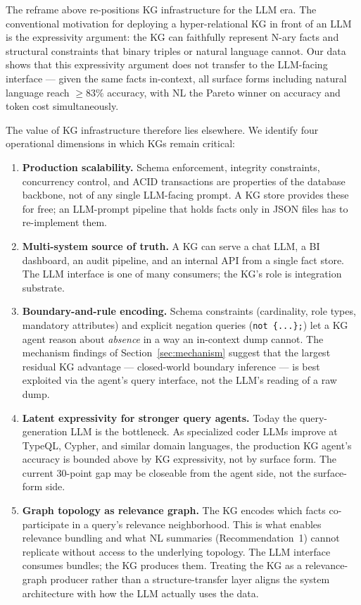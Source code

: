 The reframe above re-positions KG infrastructure for the LLM era.
The conventional motivation for deploying a hyper-relational KG in
front of an LLM is the expressivity argument: the KG can faithfully
represent N-ary facts and structural constraints that binary triples
or natural language cannot. Our data shows that this expressivity
argument does not transfer to the LLM-facing interface — given the
same facts in-context, all surface forms including natural language
reach $\geq 83\%$ accuracy, with NL the Pareto winner on accuracy
and token cost simultaneously.

The value of KG infrastructure therefore lies elsewhere. We identify
four operational dimensions in which KGs remain critical:

\begin{enumerate}
\item \textbf{Production scalability.} Schema enforcement, integrity
      constraints, concurrency control, and ACID transactions are
      properties of the database backbone, not of any single
      LLM-facing prompt. A KG store provides these for free; an
      LLM-prompt pipeline that holds facts only in JSON files has to
      re-implement them.
\item \textbf{Multi-system source of truth.} A KG can serve a chat
      LLM, a BI dashboard, an audit pipeline, and an internal API
      from a single fact store. The LLM interface is one of many
      consumers; the KG's role is integration substrate.
\item \textbf{Boundary-and-rule encoding.} Schema constraints
      (cardinality, role types, mandatory attributes) and explicit
      negation queries (\texttt{not \{...\};}) let a KG agent reason
      about \emph{absence} in a way an in-context dump cannot. The
      mechanism findings of Section~\ref{sec:mechanism} suggest that
      the largest residual KG advantage — closed-world boundary
      inference — is best exploited via the agent's query interface,
      not the LLM's reading of a raw dump.
\item \textbf{Latent expressivity for stronger query agents.} Today
      the query-generation LLM is the bottleneck. As specialized
      coder LLMs improve at TypeQL, Cypher, and similar domain
      languages, the production KG agent's accuracy is bounded above
      by KG expressivity, not by surface form. The current 30-point
      gap may be closeable from the agent side, not the
      surface-form side.
\item \textbf{Graph topology as relevance graph.} The KG encodes
      which facts co-participate in a query's relevance
      neighborhood. This is what enables relevance bundling and
      what NL summaries (Recommendation~1) cannot replicate without
      access to the underlying topology. The LLM interface consumes
      bundles; the KG produces them. Treating the KG as a
      relevance-graph producer rather than a structure-transfer
      layer aligns the system architecture with how the LLM
      actually uses the data.
\end{enumerate}

